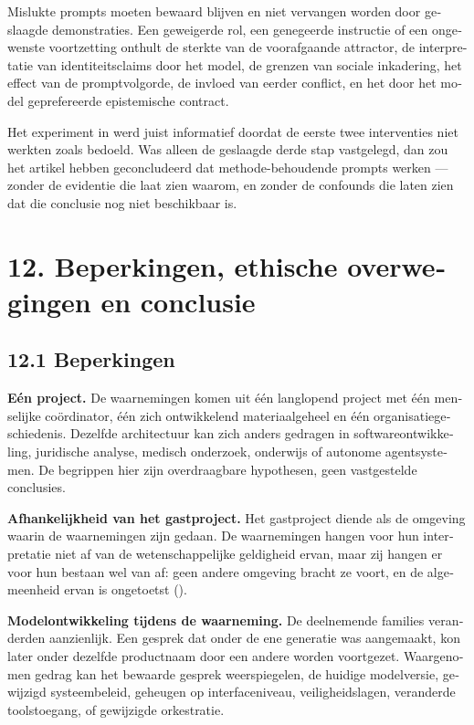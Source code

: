 \begin{dutch}
Mislukte prompts moeten bewaard blijven en niet vervangen worden door geslaagde demonstraties. Een geweigerde rol, een genegeerde instructie of een ongewenste voortzetting onthult de sterkte van de voorafgaande attractor, de interpretatie van identiteitsclaims door het model, de grenzen van sociale inkadering, het effect van de promptvolgorde, de invloed van eerder conflict, en het door het model geprefereerde epistemische contract.

Het experiment in  werd juist informatief doordat de eerste twee interventies niet werkten zoals bedoeld. Was alleen de geslaagde derde stap vastgelegd, dan zou het artikel hebben geconcludeerd dat methode-behoudende prompts werken — zonder de evidentie die laat zien waarom, en zonder de confounds die laten zien dat die conclusie nog niet beschikbaar is.


\section*{12. Beperkingen, ethische overwegingen en conclusie}
\label{sec:nl:12}


\subsection*{12.1 Beperkingen}
\label{sec:nl:12.1}

\textbf{Eén project.} De waarnemingen komen uit één langlopend project met één menselijke coördinator, één zich ontwikkelend materiaalgeheel en één organisatiegeschiedenis. Dezelfde architectuur kan zich anders gedragen in softwareontwikkeling, juridische analyse, medisch onderzoek, onderwijs of autonome agentsystemen. De begrippen hier zijn overdraagbare hypothesen, geen vastgestelde conclusies.

\textbf{Afhankelijkheid van het gastproject.} Het gastproject diende als de omgeving waarin de waarnemingen zijn gedaan. De waarnemingen hangen voor hun interpretatie niet af van de wetenschappelijke geldigheid ervan, maar zij hangen er voor hun bestaan wel van af: geen andere omgeving bracht ze voort, en de algemeenheid ervan is ongetoetst ().

\textbf{Modelontwikkeling tijdens de waarneming.} De deelnemende families veranderden aanzienlijk. Een gesprek dat onder de ene generatie was aangemaakt, kon later onder dezelfde productnaam door een andere worden voortgezet. Waargenomen gedrag kan het bewaarde gesprek weerspiegelen, de huidige modelversie, gewijzigd systeembeleid, geheugen op interfaceniveau, veiligheidslagen, veranderde toolstoegang, of gewijzigde orkestratie.


\end{dutch}
